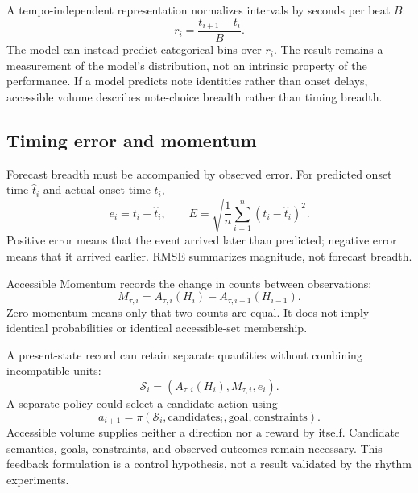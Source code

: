 \documentclass[11pt,a4paper]{article}
\begin{document}
A tempo-independent representation normalizes intervals by seconds per beat $B$:
\begin{equation}
r_i=\frac{t_{i+1}-t_i}{B}.
\end{equation}
The model can instead predict categorical bins over $r_i$. The result remains a measurement of the model's distribution, not an intrinsic property of the performance. If a model predicts note identities rather than onset delays, accessible volume describes note-choice breadth rather than timing breadth.

\subsection{Timing error and momentum}
Forecast breadth must be accompanied by observed error. For predicted onset time $\hat t_i$ and actual onset time $t_i$,
\begin{equation}
e_i=t_i-\hat t_i,\qquad
E=\sqrt{\frac{1}{n}\sum_{i=1}^{n}(t_i-\hat t_i)^2}.
\end{equation}
Positive error means that the event arrived later than predicted; negative error means that it arrived earlier. RMSE summarizes magnitude, not forecast breadth.

Accessible Momentum records the change in counts between observations:
\begin{equation}
M_{\tau,i}=A_{\tau,i}(H_i)-A_{\tau,i-1}(H_{i-1}).
\end{equation}
Zero momentum means only that two counts are equal. It does not imply identical probabilities or identical accessible-set membership.

A present-state record can retain separate quantities without combining incompatible units:
\begin{equation}
\mathcal{S}_i=(A_{\tau,i}(H_i),M_{\tau,i},e_i).
\end{equation}
A separate policy could select a candidate action using
\begin{equation}
a_{i+1}=\pi(\mathcal{S}_i,\text{candidates}_i,\text{goal},\text{constraints}).
\end{equation}
Accessible volume supplies neither a direction nor a reward by itself. Candidate semantics, goals, constraints, and observed outcomes remain necessary. This feedback formulation is a control hypothesis, not a result validated by the rhythm experiments.
\end{document}
